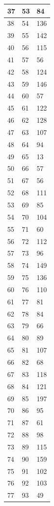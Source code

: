 \begin{tabular}{p{}p{}p{}}
\hline
37 & 53 & 84 \\
\hline
38 & 54 & 136 \\
\hline
39 & 55 & 142 \\
\hline
40 & 56 & 115 \\
\hline
41 & 57 & 56 \\
\hline
42 & 58 & 124 \\
\hline
43 & 59 & 146 \\
\hline
44 & 60 & 57 \\
\hline
45 & 61 & 122 \\
\hline
46 & 62 & 128 \\
\hline
47 & 63 & 107 \\
\hline
48 & 64 & 94 \\
\hline
49 & 65 & 13 \\
\hline
50 & 66 & 57 \\
\hline
51 & 67 & 56 \\
\hline
52 & 68 & 111 \\
\hline
53 & 69 & 85 \\
\hline
54 & 70 & 104 \\
\hline
55 & 71 & 60 \\
\hline
56 & 72 & 112 \\
\hline
57 & 73 & 96 \\
\hline
58 & 74 & 149 \\
\hline
59 & 75 & 136 \\
\hline
60 & 76 & 110 \\
\hline
61 & 77 & 81 \\
\hline
62 & 78 & 84 \\
\hline
63 & 79 & 66 \\
\hline
64 & 80 & 89 \\
\hline
65 & 81 & 107 \\
\hline
66 & 82 & 68 \\
\hline
67 & 83 & 118 \\
\hline
68 & 84 & 121 \\
\hline
69 & 85 & 197 \\
\hline
70 & 86 & 95 \\
\hline
71 & 87 & 61 \\
\hline
72 & 88 & 98 \\
\hline
73 & 89 & 115 \\
\hline
74 & 90 & 159 \\
\hline
75 & 91 & 102 \\
\hline
76 & 92 & 103 \\
\hline
77 & 93 & 49 \\

\end{tabular}
